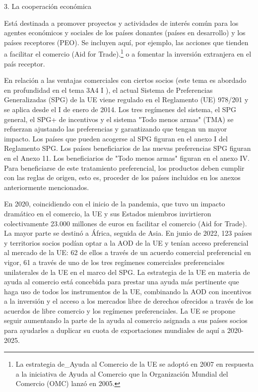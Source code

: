 \documentclass[10pt,a4paper]{article}
\newcounter{anexo}
\begin{document}
{3. La cooperación económica

Está destinada a promover proyectos y actividades de interés común para los agentes económicos y sociales de los países donantes (países en desarrollo) y los países receptores (PEO). Se incluyen aquí, por ejemplo, las acciones que tienden a facilitar el comercio (Aid for Trade).\footnote{%
    La estrategia de_Ayuda al Comercio de la UE se adoptó en 2007 en respuesta a la iniciativa de Ayuda al Comercio que la Organización Mundial del Comercio (OMC) lanzó en 2005.
} o a fomentar la inversión extranjera en el país receptor.

En relación a las ventajas comerciales con ciertos socios (este tema es abordado en profundidad en el tema 3A4 I ), el actual Sistema de Preferencias Generalizadas (SPG) de la UE viene regulado en el Reglamento (UE) 978/201 y se aplica desde el I de enero de 2014. Los tres regímenes del sistema, el SPG general, el SPG+ de incentivos y el sistema "Todo menos armas" (TMA) se refuerzan ajustando las preferencias y garantizando que tengan un mayor impacto. Los países que pueden acogerse al SPG figuran en el anexo I del Reglamento SPG. Los países beneficiarios de las nuevas preferencias SPG figuran en el Anexo 11. Los beneficiarios de "Todo menos armas" figuran en el anexo IV. Para beneficiarse de este tratamiento preferencial, los  productos deben cumplir con las reglas de origen, esto es, proceder de los países incluidos en los anexos anteriormente mencionados.

En 2020, coincidiendo con el inicio de la pandemia, que tuvo un impacto dramático en el comercio, la UE y sus Estados miembros invirtieron colectivamente 23.000 millones de euros en facilitar el comercio (Aid for Trade). La mayor parte se destinó a África, seguida de Asia. En junio de 2022, 123 países y territorios socios podían optar a la AOD de la UE y tenían acceso preferencial al mercado de la UE: 62 de ellos a través de un acuerdo comercial preferencial en vigor, 61 a través de uno de los tres regímenes comerciales preferenciales unilaterales de la UE en el marco del SPG. La estrategia de la UE en materia de ayuda al comercio está concebida para prestar una ayuda más pertinente que haga uso de todos los instrumentos de la UE, combinando la AOD con incentivos a la inversión y el acceso a los mercados libre de derechos ofrecidos a través de los acuerdos de libre comercio y los regímenes preferenciales. La UE se propone seguir aumentando la parte de la ayuda al comercio asignada a sus países socios para ayudarles a duplicar su cuota de exportaciones mundiales de aquí a 2020- 2025.

}
\end{document}
